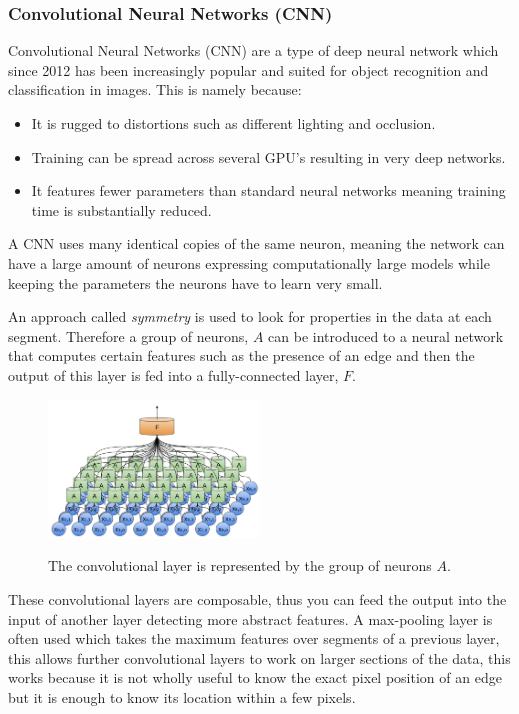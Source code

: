 \documentclass{mproj}
\begin{document}
\subsubsection{Convolutional Neural Networks (CNN)}
  
Convolutional Neural Networks (CNN) are a type of deep neural network which since 2012\cite{Girshick2014} has been  increasingly popular and suited for object recognition and classification in images. This is namely because:

\begin{itemize}
\item It is rugged to distortions such as different lighting and occlusion.
\item Training can be spread across several GPU's resulting in very deep networks.
\item It features fewer parameters than standard neural networks meaning training time is substantially reduced.
\end{itemize}

A CNN uses many identical copies of the same neuron, meaning the network can have a large amount of neurons expressing computationally large models while keeping the parameters the neurons have to learn very small. \cite{NIPS2012_4824}
  
An approach called \textit{symmetry} is used to look for properties in the data at each segment. Therefore a group of neurons, $A$ can be introduced to a neural network that computes certain features such as the presence of an edge and then the output of this layer is fed into a fully-connected layer, $F$.
  
\begin{figure}[h]
  \caption{The convolutional layer is represented by the group of neurons $A$.}
  \centering
  \includegraphics[width=0.5\textwidth]{images/conv.png}
  \label{fig:Basic CNN diagram}
\end{figure}

These convolutional layers are composable, thus you can feed the output into the input of another layer detecting more abstract features. A max-pooling layer is often used which takes the maximum features over segments of a previous layer, this allows further convolutional layers to work on larger sections of the data, this works because it is not wholly useful to know the exact pixel position of an edge but it is enough to know its location within a few pixels.
 
\end{document}

